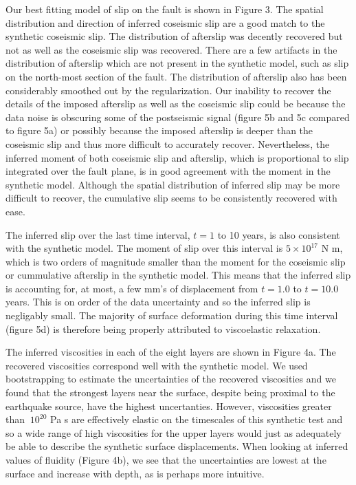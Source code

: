 \documentclass[extra,mreferee]{gji}
\begin{document}
Our best fitting model of slip on the fault is shown in Figure 3.  The
spatial distribution and direction of inferred coseismic slip are a
good match to the synthetic coseismic slip.  The distribution of
afterslip was decently recovered but not as well as the coseismic slip
was recovered.  There are a few artifacts in the distribution of
afterslip which are not present in the synthetic model, such as slip
on the north-most section of the fault.  The distribution of afterslip
also has been considerably smoothed out by the regularization. Our
inability to recover the details of the imposed afterslip as well as
the coseismic slip could be because the data noise is obscuring some
of the postseismic signal (figure 5b and 5c compared to figure 5a) or
possibly because the imposed afterslip is deeper than the coseismic
slip and thus more difficult to accurately recover.  Nevertheless, the
inferred moment of both coseismic slip and afterslip, which is
proportional to slip integrated over the fault plane, is in good
agreement with the moment in the synthetic model.  Although the
spatial distribution of inferred slip may be more difficult to
recover, the cumulative slip seems to be consistently recovered with
ease.

The inferred slip over the last time interval, $t=1$ to 10 years, is
also consistent with the synthetic model.  The moment of slip over
this interval is $5\times 10^{17}$ N m, which is two orders of
magnitude smaller than the moment for the coseismic slip or
cummulative afterslip in the synthetic model.  This means that the
inferred slip is accounting for, at most, a few mm's of displacement
from $t=1.0$ to $t=10.0$ years.  This is on order of the data
uncertainty and so the inferred slip is negligably small.  The
majority of surface deformation during this time interval (figure 5d)
is therefore being properly attributed to viscoelastic relaxation.

The inferred viscosities in each of the eight layers are shown in
Figure 4a.  The recovered viscosities correspond well with the
synthetic model.  We used bootstrapping to estimate the uncertainties
of the recovered viscosities and we found that the strongest layers
near the surface, despite being proximal to the earthquake source,
have the highest uncertanties.  However, viscosities greater than
$~10^{20}$ Pa s are effectively elastic on the timescales of this
synthetic test and so a wide range of high viscosities for the upper
layers would just as adequately be able to describe the synthetic
surface displacements.  When looking at inferred values of fluidity
(Figure 4b), we see that the uncertainties are lowest at the surface
and increase with depth, as is perhaps more intuitive.
\end{document}
